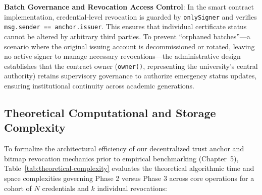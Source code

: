 \textbf{Batch Governance and Revocation Access Control}:
In the smart contract implementation, credential-level revocation is guarded by \texttt{onlySigner} and verifies \texttt{msg.sender == anchor.issuer}. This ensures that individual certificate status cannot be altered by arbitrary third parties. To prevent ``orphaned batches''—a scenario where the original issuing account is decommissioned or rotated, leaving no active signer to manage necessary revocations—the administrative design establishes that the contract owner (\texttt{owner()}, representing the university's central authority) retains supervisory governance to authorize emergency status updates, ensuring institutional continuity across academic generations.

\subsection{Theoretical Computational and Storage Complexity}

To formalize the architectural efficiency of our decentralized trust anchor and bitmap revocation mechanics prior to empirical benchmarking (Chapter~5), Table~\ref{tab:theoretical-complexity} evaluates the theoretical algorithmic time and space complexities governing Phase 2 versus Phase 3 across core operations for a cohort of $N$ credentials and $k$ individual revocations:

